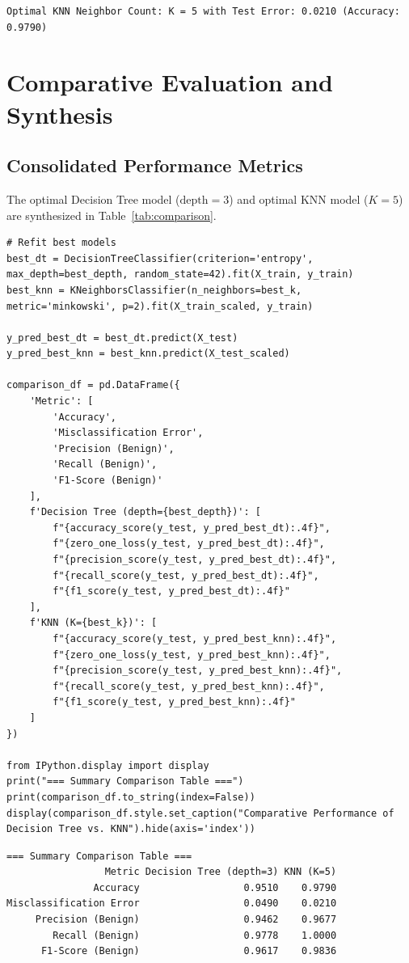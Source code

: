 \documentclass[12pt]{article}
\begin{document}
\begin{lstlisting}[style=output]
Optimal KNN Neighbor Count: K = 5 with Test Error: 0.0210 (Accuracy: 0.9790)
\end{lstlisting}

\newpage
\section{Comparative Evaluation and Synthesis}

\subsection{Consolidated Performance Metrics}
The optimal Decision Tree model ($\text{depth}=3$) and optimal KNN model ($K=5$) are synthesized in Table~\ref{tab:comparison}.

\begin{lstlisting}[style=code]
# Refit best models
best_dt = DecisionTreeClassifier(criterion='entropy', max_depth=best_depth, random_state=42).fit(X_train, y_train)
best_knn = KNeighborsClassifier(n_neighbors=best_k, metric='minkowski', p=2).fit(X_train_scaled, y_train)

y_pred_best_dt = best_dt.predict(X_test)
y_pred_best_knn = best_knn.predict(X_test_scaled)

comparison_df = pd.DataFrame({
    'Metric': [
        'Accuracy',
        'Misclassification Error',
        'Precision (Benign)',
        'Recall (Benign)',
        'F1-Score (Benign)'
    ],
    f'Decision Tree (depth={best_depth})': [
        f"{accuracy_score(y_test, y_pred_best_dt):.4f}",
        f"{zero_one_loss(y_test, y_pred_best_dt):.4f}",
        f"{precision_score(y_test, y_pred_best_dt):.4f}",
        f"{recall_score(y_test, y_pred_best_dt):.4f}",
        f"{f1_score(y_test, y_pred_best_dt):.4f}"
    ],
    f'KNN (K={best_k})': [
        f"{accuracy_score(y_test, y_pred_best_knn):.4f}",
        f"{zero_one_loss(y_test, y_pred_best_knn):.4f}",
        f"{precision_score(y_test, y_pred_best_knn):.4f}",
        f"{recall_score(y_test, y_pred_best_knn):.4f}",
        f"{f1_score(y_test, y_pred_best_knn):.4f}"
    ]
})

from IPython.display import display
print("=== Summary Comparison Table ===")
print(comparison_df.to_string(index=False))
display(comparison_df.style.set_caption("Comparative Performance of Decision Tree vs. KNN").hide(axis='index'))
\end{lstlisting}

\begin{lstlisting}[style=output]
=== Summary Comparison Table ===
                 Metric Decision Tree (depth=3) KNN (K=5)
               Accuracy                  0.9510    0.9790
Misclassification Error                  0.0490    0.0210
     Precision (Benign)                  0.9462    0.9677
        Recall (Benign)                  0.9778    1.0000
      F1-Score (Benign)                  0.9617    0.9836
\end{lstlisting}
\end{document}
